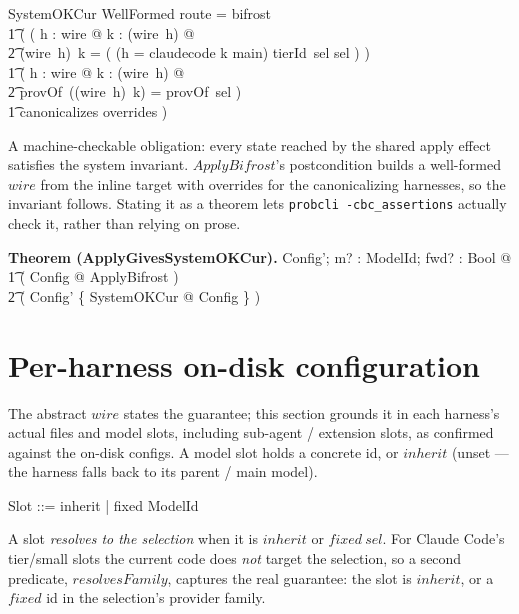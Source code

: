 \documentclass{article}
\makeatletter
\newenvironment{theorem}[1]{\medskip\noindent\textbf{Theorem (#1).}\@nameuse{zed}}{\@nameuse{endzed}}
\makeatother
\begin{document}
\begin{schema}{SystemOKCur}
  WellFormed
\where
  route = bifrost \implies \\
  \t1 ( ( \forall h : \dom wire @ \forall k : \dom (wire~h) @ \\
  \t2     (wire~h)~k = ( \IF (h = claudecode \land k \neq main) \THEN tierId~sel \ELSE sel ) ) \land \\
  \t1   ( \forall h : \dom wire @ \forall k : \dom (wire~h) @ \\
  \t2     provOf~((wire~h)~k) = provOf~sel ) \land \\
  \t1   canonicalizes \subseteq overrides )
\end{schema}

A machine-checkable obligation: every state reached by the shared apply effect
satisfies the system invariant. $ApplyBifrost$'s postcondition builds a
well-formed $wire$ from the inline target with overrides for the canonicalizing
harnesses, so the invariant follows. Stating it as a theorem lets
\texttt{probcli -cbc\_assertions} actually check it, rather than relying on
prose.

\begin{theorem}{ApplyGivesSystemOKCur}
  \forall Config'; m? : ModelId; fwd? : Bool @ \\
  \t1 ( \exists Config @ ApplyBifrost ) \implies \\
  \t2 ( \theta Config' \in \{ SystemOKCur @ \theta Config \} )
\end{theorem}

\section{Per-harness on-disk configuration}

The abstract $wire$ states the guarantee; this section grounds it in each
harness's actual files and model slots, including sub-agent / extension slots,
as confirmed against the on-disk configs. A model slot holds a concrete id, or
$inherit$ (unset --- the harness falls back to its parent / main model).

\begin{zed}
  Slot ::= inherit | fixed \ldata ModelId \rdata
\end{zed}

A slot \emph{resolves to the selection} when it is $inherit$ or $fixed~sel$.
For Claude Code's tier/small slots the current code does \emph{not} target the
selection, so a second predicate, $resolvesFamily$, captures the real
guarantee: the slot is $inherit$, or a $fixed$ id in the selection's provider
family.
\end{document}
